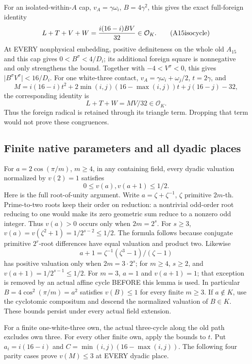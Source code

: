 For an isolated-within-\(A\) cap,
\(v_A=\gamma\omega_i\), \(B=4\gamma^2\),
this gives the exact full-foreign identity
\[
              L+T+V+W={i(16-i)BV\over32}\in\mathcal O_K.
\tag{A15isocycle}\label{eq:arithA15isocycle}
\]
At EVERY nonphysical embedding, positive definiteness on the
whole old \(A_{15}\) and this cap gives
\(0<B^\sigma<4/D_i\); its additional foreign square is
nonnegative and only strengthens the bound.
Together with \(-4<V^\sigma<0\), this gives
\(\lvert B^\sigma V^\sigma\rvert<16/D_i\).
For one white-three contact,
\(v_A=\gamma\omega_i+\omega_j/2\),
\(t=2\gamma\), and
\[
 M=i(16-i)t^2+2\min(i,j)(16-\max(i,j))t+j(16-j)-32,
\]
the corresponding identity is
\[
                         L+T+W=MV/32\in\mathcal O_K.
\tag{A15whitecycle}\label{eq:arithA15whitecycle}
\]
Thus the foreign radical is retained through its triangle term.
Dropping that term would not prove these congruences.

\subsection{Finite native parameters and all dyadic places}
\label{app:arithA15dyadic}

For \(a=2\cos(\pi/m)\), \(m\ge4\), in any containing field,
every dyadic valuation normalized by \(v(2)=1\) satisfies
\[
                         0\le v(a),v(a+1)\le1/2 .
\]
Here is the full root-of-unity argument.
Write \(a=\zeta+\zeta^{-1}\), \(\zeta\) primitive \(2m\)-th.
Prime-to-two roots keep their order on reduction: a nontrivial
odd-order root reducing to one would make its zero geometric
sum reduce to a nonzero odd integer.
Thus \(v(a)>0\) occurs only when \(2m=2^s\).
For \(s\ge3\),
\(v(a)=v(\zeta^2+1)=1/2^{s-2}\le1/2\).
The formula follows because conjugate primitive \(2^r\)-root
differences have equal valuation and product two.
Likewise
\[
                a+1=\zeta^{-1}(\zeta^3-1)/(\zeta-1)
\]
has positive valuation only when \(2m=3\cdot2^s\);
for \(m\ge4\), \(s\ge2\), and
\(v(a+1)=1/2^{s-1}\le1/2\).
For \(m=3\), \(a=1\) and \(v(a+1)=1\); that exception is
removed by an actual affine cycle BEFORE this lemma is used.
In particular \(B=4\cos^2(\pi/m)=a^2\) satisfies \(v(B)\le1\)
for every finite \(m\ge3\).
If \(a\notin K\), use the cyclotomic compositum and descend
the normalized valuation of \(B\in K\).
These bounds persist under every actual field extension.

For a finite one-white-three own, the actual three-cycle
along the old path excludes own three.
For every other finite own, apply the bounds to \(t\).
Put \(a_i=i(16-i)\) and \(C=\min(i,j)(16-\max(i,j))\).
The following four parity cases prove \(v(M)\le3\)
at EVERY dyadic place.

